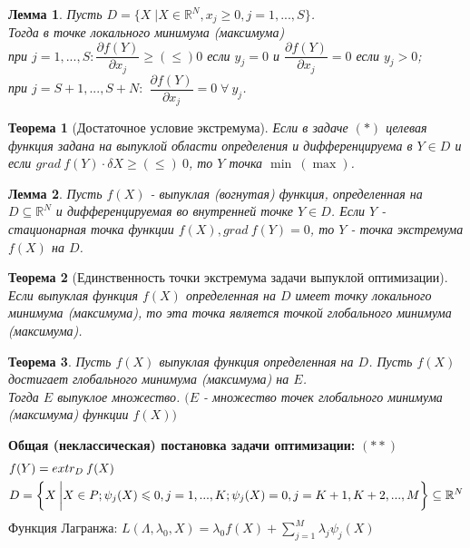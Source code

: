 \documentclass[12pt]{article}
\newtheorem{lemma}{Лемма}[section]
\newtheorem{theorem}{Теорема}[section]
\theoremstyle{definition}
\theoremstyle{remark}
\begin{document}
\begin{lemma}
  Пусть $D=\bigg\{X\;\big|X\in\mathbb{R}^N, x_j \geqslant 0,j=1,...,S  \bigg\}$.\\
  Тогда в точке локального минимума (максимума) \\
  при $j=1,...,S: \dfrac{\partial f(Y)}{\partial x_j}\geqslant(\leqslant)0$ если $y_j=0$ и $ \dfrac{\partial f(Y)}{\partial x_j}=0$ если $y_j>0$; \\
  при $j=S+1,...,S+N:$ $\dfrac{\partial f(Y)}{\partial x_j}=0 \;\forall\:y_j$.
\end{lemma}
\begin{theorem}[Достаточное условие экстремума]
Если в задаче $(*)$ целевая функция задана на выпуклой области определения и дифференцируема в $Y\in D$ и если $grad \:f(Y)\cdot\delta X\geqslant(\leqslant)\:0$, то  $Y$ точка $\min\: (\max)$.
\end{theorem}
\begin{lemma}
  Пусть $f (X)$ - выпуклая (вогнутая) функция, определенная на $D \subseteq \mathbb{R}^N$ и дифференцируемая во внутренней точке $Y \in D$.
Если $Y$ - стационарная точка функции $f (X), grad\: f(Y) = 0$, то $Y$ - точка экстремума $f(X)$ на $D$.
\end{lemma}
\begin{theorem}[Единственность точки экстремума задачи выпуклой оптимизации]
  Если выпуклая функция $f(X)$ определенная на $D$ имеет точку локального минимума (максимума), то эта точка является точкой глобального минимума (максимума).
\end{theorem}
\begin{theorem}
  Пусть $f(X)$ выпуклая функция определенная на $D$. Пусть $f(X)$ достигает глобального минимума (максимума) на $E$.\\
  Тогда $E$ выпуклое множество. $(E$ - множество точек глобального минимума (максимума) функции $f(X))$
\end{theorem}
\textbf{Общая (неклассическая) постановка задачи оптимизации: }$(**)$
\begin{align}
   &f(Y)=extr_D\:f(X)\notag\\
   &D=\bigg\{ X\:\bigg|X\in P; \psi_j(X)\leqslant 0,j=1,...,K;\psi_j(X)= 0,j=K+1,K+2,...,M \bigg\}\subseteq \mathbb{R}^N\notag\\
\end{align}
Функция Лагранжа: $\displaystyle L(\Lambda,\lambda_0,X)=\lambda_0f(X)+\sum_{j=1}^M\lambda_j\psi_j(X)$
\end{document}
